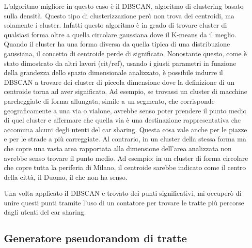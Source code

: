 \documentclass[a4paper]{report}
\begin{document}
	L'algoritmo migliore in questo caso è il DBSCAN, algoritmo di clustering basato sulla densità. Questo tipo di clusterizzazione però non trova dei centroidi, ma solamente i cluster. Infatti questo algoritmo è in grado di trovare cluster di qualsiasi forma oltre a quella circolare gaussiana dove il K-means da il meglio. Quando il cluster ha una forma diversa da quella tipica di una distribuzione gaussiana, il concetto di centroide perde di significato. Nonostante questo, come è stato dimostrato da altri lavori (cit/ref), usando i giusti parametri in funzione della grandezza dello spazio dimensionale analizzato, è possibile indurre il DBSCAN a trovare dei cluster di piccola dimensione dove la definizione di un centroide torna ad aver significato. Ad esempio, se trovassi un cluster di macchine parcheggiate di forma allungata, simile a un segmento, che corrisponde geograficamente a una via o vialone, avrebbe senso poter prendere il punto medio di quel cluster e affermare che quella via è una destinazione rappresentativa che accomuna alcuni degli utenti del car sharing. Questa cosa vale anche per le piazze e per le strade a più carreggiate. Al contrario, in un cluster della stessa forma ma che copre una vasta area rapportata alla dimensione dell'area analizzata non avrebbe senso trovare il punto medio. Ad esempio: in un cluster di forma circolare che copre tutta la periferia di Milano, il centroide sarebbe indicato come il centro della città, il Duomo, il che non ha senso.
	
	Una volta applicato il DBSCAN e trovato dei punti significativi, mi occuperò di unire questi punti tramite l'uso di un contatore per trovare le tratte più percorse dagli utenti del car sharing.
	
	\subsection{Generatore pseudorandom di tratte}

	
	
\end{document}
